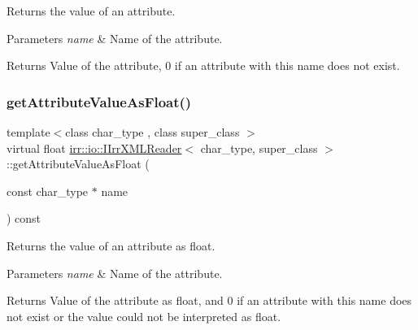 Returns the value of an attribute. 


\begin{DoxyParams}{Parameters}
{\em name} & Name of the attribute. \\
\hline
\end{DoxyParams}
\begin{DoxyReturn}{Returns}
Value of the attribute, 0 if an attribute with this name does not exist. 
\end{DoxyReturn}
\mbox{\label{classirr_1_1io_1_1IIrrXMLReader_a2b1032f213e9910827842f6057269235}} 
\subsubsection{\texorpdfstring{get\+Attribute\+Value\+As\+Float()}{getAttributeValueAsFloat()}\hspace{0.1cm}{\footnotesize\ttfamily [1/4]}}
{\footnotesize\ttfamily template$<$class char\+\_\+type , class super\+\_\+class $>$ \\
virtual float \hyperlink{classirr_1_1io_1_1IIrrXMLReader}{irr\+::io\+::\+I\+Irr\+X\+M\+L\+Reader}$<$ char\+\_\+type, super\+\_\+class $>$\+::get\+Attribute\+Value\+As\+Float (\begin{DoxyParamCaption}\item[{const char\+\_\+type $\ast$}]{name }\end{DoxyParamCaption}) const\hspace{0.3cm}{\ttfamily [pure virtual]}}



Returns the value of an attribute as float. 


\begin{DoxyParams}{Parameters}
{\em name} & Name of the attribute. \\
\hline
\end{DoxyParams}
\begin{DoxyReturn}{Returns}
Value of the attribute as float, and 0 if an attribute with this name does not exist or the value could not be interpreted as float. 
\end{DoxyReturn}
\mbox{\label{classirr_1_1io_1_1IIrrXMLReader_a2b1032f213e9910827842f6057269235}} 
